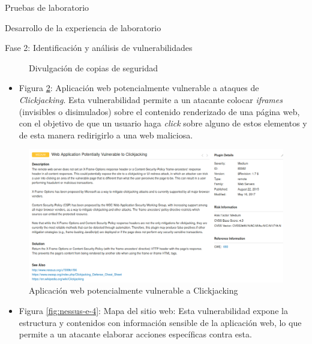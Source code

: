 \begin{section}{Pruebas de laboratorio}
\begin{subsection}{Desarrollo de la experiencia de laboratorio}
\begin{subsubsection} {Fase 2: Identificación y análisis de vulnerabilidades}
\begin{figure}[H]
    \caption{Divulgación de copias de seguridad}
    \label{fig:nessus-e-1}
    \end{figure}
    \FloatBarrier 
    \begin{itemize}
        \item   Figura \ref{fig:nessus-e-2}: Aplicación web potencialmente vulnerable a ataques de \textit{Clickjacking}. Esta vulnerabilidad permite a un atacante colocar \textit{iframes} (invisibles o disimulados) sobre el contenido renderizado de una página web, con el objetivo de que un usuario haga \textit{click} sobre alguno de estos elementos y de esta manera redirigirlo a una web maliciosa.
    \end{itemize}
    \begin{figure}[H]
    \centering
    \includegraphics[width=1\textwidth]{./iteracion_3_imagenes/nessus-e-2.png}
    \caption{Aplicación web potencialmente vulnerable a Clickjacking}
    \label{fig:nessus-e-2}
    \end{figure}
    \FloatBarrier 
    \begin{itemize}
        \item  Figura \ref{fig:nessus-e-4}: Mapa del sitio web: Esta vulnerabilidad expone la estructura y contenidos con información sensible de la aplicación web, lo que permite a un atacante  elaborar acciones específicas contra esta. 
    \end{itemize}
   

\end{subsubsection}
\end{subsection}
\end{section}
